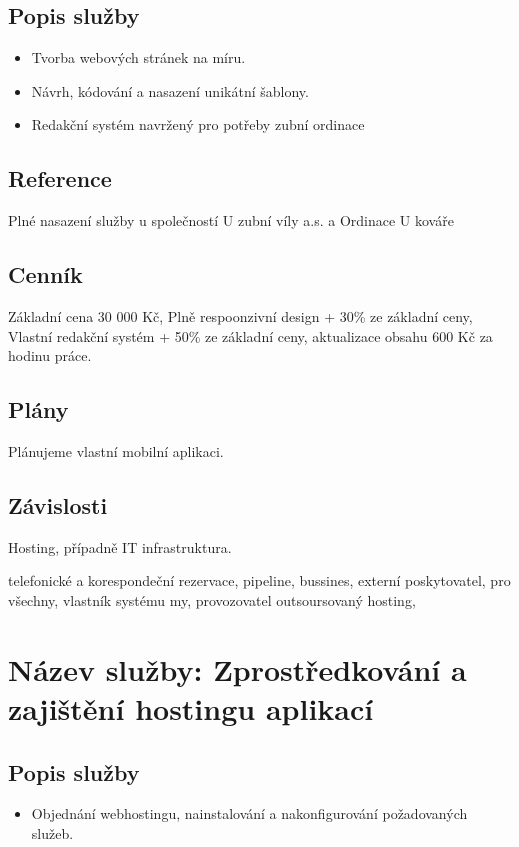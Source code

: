 \documentclass[12pt, a4paper, titlepage]{article}
\begin{document}
	\vspace{1em}

	\subsection*{Popis služby}
	\begin{itemize}
		\item Tvorba webových stránek na míru.
		\item Návrh, kódování a nasazení unikátní šablony.
		\item Redakční systém navržený pro potřeby zubní ordinace
	\end{itemize}

	\newpage

	\noindent\makebox[\linewidth]{\rule{16cm}{0.4pt}}

	\subsection*{Reference}
	Plné nasazení služby u společností U zubní víly a.s. a Ordinace U kováře

	\subsection*{Cenník}
	Základní cena 30 000 Kč, Plně respoonzivní design + 30\% ze základní ceny, Vlastní redakční systém + 50\% ze základní ceny, aktualizace obsahu 600 Kč za hodinu práce.

	\subsection*{Plány}
	Plánujeme vlastní mobilní aplikaci.

	\subsection*{Závislosti}
	Hosting, případně IT infrastruktura.

	telefonické a korespondeční rezervace, pipeline, bussines, externí poskytovatel, pro všechny,
	vlastník systému my, provozovatel outsoursovaný hosting, 


	\section*{Název služby: Zprostředkování a zajištění hostingu aplikací}	
	\vspace{1em}
	\subsection*{Popis služby}
	\begin{itemize}
		\item Objednání webhostingu, nainstalování a nakonfigurování požadovaných služeb.
	\end{itemize}
\end{document}
